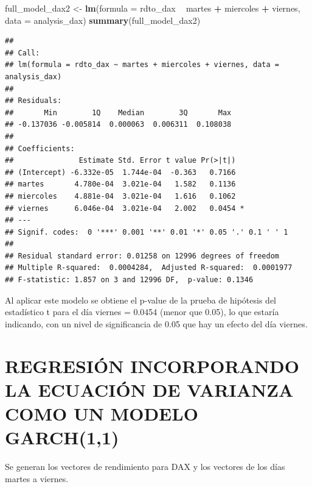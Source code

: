 \documentclass[
  11pt,
]{article}
\newenvironment{Shaded}{\begin{snugshade}}{\end{snugshade}}
\newcommand{\DataTypeTok}[1]{\textcolor[rgb]{0.13,0.29,0.53}{#1}}
\newcommand{\KeywordTok}[1]{\textcolor[rgb]{0.13,0.29,0.53}{\textbf{#1}}}
\newcommand{\NormalTok}[1]{#1}
\newcommand{\OperatorTok}[1]{\textcolor[rgb]{0.81,0.36,0.00}{\textbf{#1}}}
\newcommand{\StringTok}[1]{\textcolor[rgb]{0.31,0.60,0.02}{#1}}
\begin{document}
\begin{Shaded}
\begin{Highlighting}[]
\NormalTok{full_model_dax2 <-}\StringTok{ }\KeywordTok{lm}\NormalTok{(}\DataTypeTok{formula =}\NormalTok{ rdto_dax }\OperatorTok{~}\StringTok{ }\NormalTok{martes }\OperatorTok{+}\StringTok{ }\NormalTok{miercoles }\OperatorTok{+}\StringTok{ }\NormalTok{viernes, }\DataTypeTok{data =}\NormalTok{ analysis_dax)}
\KeywordTok{summary}\NormalTok{(full_model_dax2)}
\end{Highlighting}
\end{Shaded}

\begin{verbatim}
## 
## Call:
## lm(formula = rdto_dax ~ martes + miercoles + viernes, data = analysis_dax)
## 
## Residuals:
##       Min        1Q    Median        3Q       Max 
## -0.137036 -0.005814  0.000063  0.006311  0.108038 
## 
## Coefficients:
##               Estimate Std. Error t value Pr(>|t|)  
## (Intercept) -6.332e-05  1.744e-04  -0.363   0.7166  
## martes       4.780e-04  3.021e-04   1.582   0.1136  
## miercoles    4.881e-04  3.021e-04   1.616   0.1062  
## viernes      6.046e-04  3.021e-04   2.002   0.0454 *
## ---
## Signif. codes:  0 '***' 0.001 '**' 0.01 '*' 0.05 '.' 0.1 ' ' 1
## 
## Residual standard error: 0.01258 on 12996 degrees of freedom
## Multiple R-squared:  0.0004284,  Adjusted R-squared:  0.0001977 
## F-statistic: 1.857 on 3 and 12996 DF,  p-value: 0.1346
\end{verbatim}

Al aplicar este modelo se obtiene el p-value de la prueba de hipótesis
del estadístico t para el día viernes = 0.0454 (menor que 0.05), lo que
estaría indicando, con un nivel de significancia de 0.05 que hay un
efecto del día viernes.

\hypertarget{regresiuxf3n-incorporando-la-ecuaciuxf3n-de-varianza-como-un-modelo-garch11}{%
\section{REGRESIÓN INCORPORANDO LA ECUACIÓN DE VARIANZA COMO UN MODELO
GARCH(1,1)}\label{regresiuxf3n-incorporando-la-ecuaciuxf3n-de-varianza-como-un-modelo-garch11}}

Se generan los vectores de rendimiento para DAX y los vectores de los
días martes a viernes.
\end{document}
